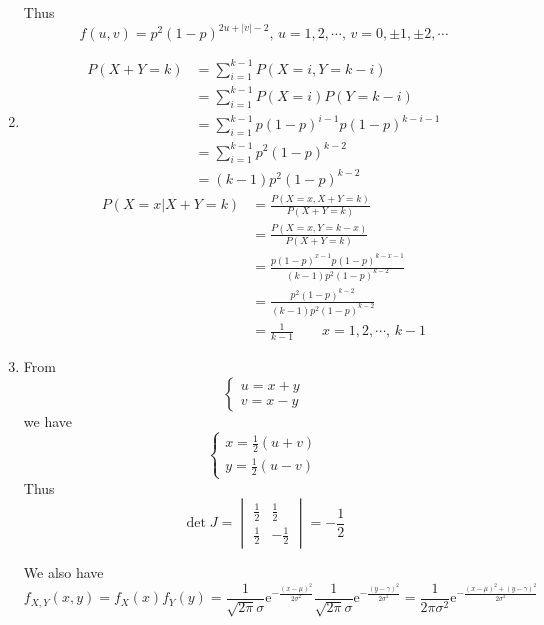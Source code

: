 \documentclass{article}
\begin{document}
\begin{enumerate}[leftmargin = 0 em, label = \arabic*., font = \bfseries]
	 Thus
	 \[f(u,v) = p^2(1 - p)^{2u + |v| - 2},\, u = 1,2,\cdots,\, v = 0, \pm 1, \pm 2,\cdots \]

	 \item 
	 \begin{align*}
	 P(X + Y = k) &= \sum_{i=1}^{k-1}P(X = i, Y = k - i) \\
	 & = \sum_{i=1}^{k-1} P(X = i) P(Y = k-i)\\
	 & = \sum_{i=1}^{k-1} p(1-p)^{i-1} p(1-p)^{k-i-1}\\
	 & = \sum_{i=1}^{k-1} p^2 (1- p)^{k-2}\\
	 &  =(k-1)p^2 (1-p)^{k-2}
	 \end{align*}
	 \begin{align*}
	 P(X  =x | X+ Y = k) & = \frac{P(X  =x , X+Y = k)}{P(X+Y  =k)}\\
	 & = \frac{P(X = x, Y = k - x)}{P(X+Y = k)}\\
	 & = \frac{p(1-p)^{x - 1} p (1-p)^{k-x-1}} {(k-1)p^2 (1-p)^{k-2}}\\
	 & = \frac{p^2 (1-p)^{k-2}}{(k-1)p^2 (1-p)^{k-2}} \\
	 & = \frac{1}{k-1} \qquad x = 1,2,\cdots,\, k-1
	 \end{align*}

	 \item 
	 From 
	 \[\begin{cases}
	 	u = x + y\\
	 	v = x - y
	 \end{cases}\]
	 we have 
	 \[\begin{cases}
	 	x = \frac{1}{2} (u +v)\\
	 	y = \frac{1}{2} (u - v)
	 \end{cases}\]
	 Thus 
	 \[\det J = \begin{vmatrix}
	 	\frac{1}{2} & \frac{1}{2}\\
	 	\frac{1}{2} & -\frac{1}{2}
	 \end{vmatrix}
	 = -\frac{1}{2}\]

	 We also have
	 \[f_{X,Y}(x,y) = f_X (x) f_{Y}(y) = \frac{1}{\sqrt{2 \pi}\sigma}\mathrm{e}^{-\frac{(x - \mu)^2}{2 \sigma^2}} \frac{1}{\sqrt{2 \pi}\sigma}\mathrm{e}^{-\frac{(y - \gamma)^2}{2 \sigma^2}} = \frac{1}{2 \pi \sigma^2} \mathrm{e}^{-\frac{(x - \mu)^2 + (y - \gamma)^2}{2 \sigma^2}}\]


\end{enumerate}
\end{document}
